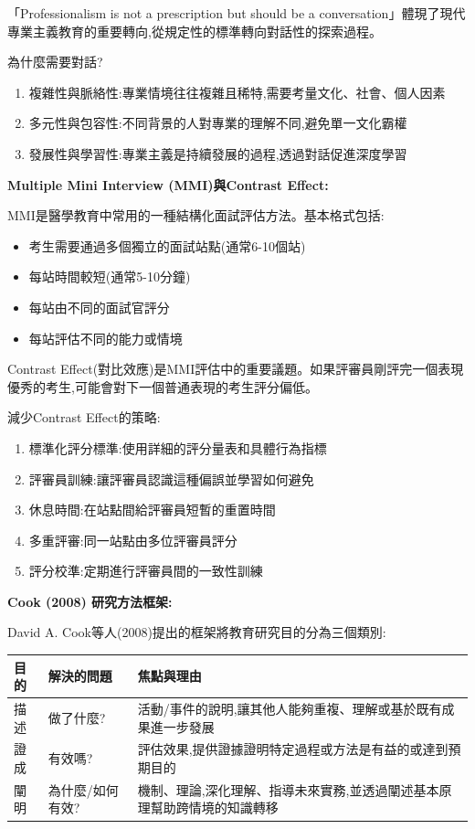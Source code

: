 \documentclass[12pt,a4paper]{article}
\begin{document}
「Professionalism is not a prescription but should be a conversation」體現了現代專業主義教育的重要轉向,從規定性的標準轉向對話性的探索過程。

為什麼需要對話?
\begin{enumerate}
    \item 複雜性與脈絡性:專業情境往往複雜且稀特,需要考量文化、社會、個人因素
    \item 多元性與包容性:不同背景的人對專業的理解不同,避免單一文化霸權
    \item 發展性與學習性:專業主義是持續發展的過程,透過對話促進深度學習
\end{enumerate}

\textbf{Multiple Mini Interview (MMI)與Contrast Effect:}

MMI是醫學教育中常用的一種結構化面試評估方法。基本格式包括:
\begin{itemize}[nosep]
    \item 考生需要通過多個獨立的面試站點(通常6-10個站)
    \item 每站時間較短(通常5-10分鐘)
    \item 每站由不同的面試官評分
    \item 每站評估不同的能力或情境
\end{itemize}

Contrast Effect(對比效應)是MMI評估中的重要議題。如果評審員剛評完一個表現優秀的考生,可能會對下一個普通表現的考生評分偏低。

減少Contrast Effect的策略:
\begin{enumerate}
    \item 標準化評分標準:使用詳細的評分量表和具體行為指標
    \item 評審員訓練:讓評審員認識這種偏誤並學習如何避免
    \item 休息時間:在站點間給評審員短暫的重置時間
    \item 多重評審:同一站點由多位評審員評分
    \item 評分校準:定期進行評審員間的一致性訓練
\end{enumerate}

\textbf{Cook (2008) 研究方法框架:}

David A. Cook等人(2008)提出的框架將教育研究目的分為三個類別:

\begin{longtable}{p{2cm}p{4cm}p{8cm}}
\toprule
\textbf{目的} & \textbf{解決的問題} & \textbf{焦點與理由} \\
\midrule
\endhead
描述 & 做了什麼? & 活動/事件的說明,讓其他人能夠重複、理解或基於既有成果進一步發展 \\
證成 & 有效嗎? & 評估效果,提供證據證明特定過程或方法是有益的或達到預期目的 \\
闡明 & 為什麼/如何有效? & 機制、理論,深化理解、指導未來實務,並透過闡述基本原理幫助跨情境的知識轉移 \\
\bottomrule
\end{longtable}
\end{document}
